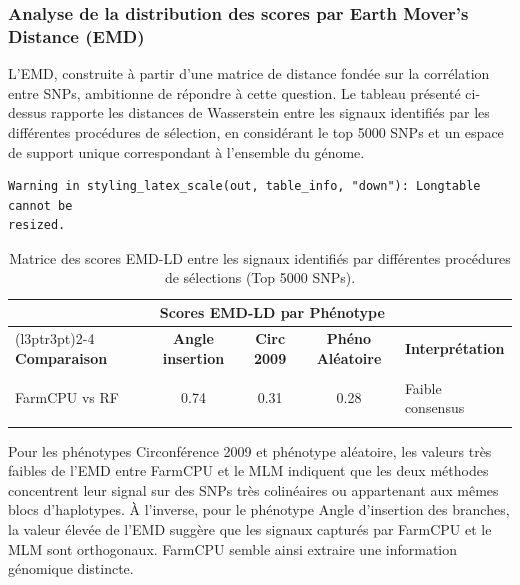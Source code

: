 \documentclass[
  11pt,
  letterpaper,
  DIV=11,
  numbers=noendperiod]{scrartcl}
\begin{document}
\hypertarget{analyse-de-la-distribution-des-scores-par-earth-movers-distance-emd}{%
\subsubsection{Analyse de la distribution des scores par Earth Mover's
Distance
(EMD)}\label{analyse-de-la-distribution-des-scores-par-earth-movers-distance-emd}}

L'EMD, construite à partir d'une matrice de distance fondée sur la
corrélation entre SNPs, ambitionne de répondre à cette question. Le
tableau présenté ci-dessus rapporte les distances de Wasserstein entre
les signaux identifiés par les différentes procédures de sélection, en
considérant le top 5000 SNPs et un espace de support unique
correspondant à l'ensemble du génome.

\begin{verbatim}
Warning in styling_latex_scale(out, table_info, "down"): Longtable cannot be
resized.
\end{verbatim}

\begin{longtable}[t]{lccc>{\raggedright\arraybackslash}p{5cm}}
\caption{Matrice des scores EMD-LD entre les signaux identifiés par différentes procédures de sélections (Top 5000 SNPs).}\\
\toprule
\multicolumn{1}{c}{ } & \multicolumn{3}{c}{Scores EMD-LD par Phénotype} & \multicolumn{1}{c}{ } \\
\cmidrule(l{3pt}r{3pt}){2-4}
\textbf{Comparaison} & \textbf{Angle insertion} & \textbf{Circ 2009} & \textbf{Phéno Aléatoire} & \textbf{Interprétation}\\
\midrule
\cellcolor{gray!10}{FarmCPU vs MLM} & \cellcolor{gray!10}{0.63} & \cellcolor{gray!10}{0.05} & \cellcolor{gray!10}{0.02} & \cellcolor{gray!10}{Divergence conditionnelle au succès FarmCPU}\\
FarmCPU vs RF & 0.74 & 0.31 & 0.28 & Faible consensus\\
\cellcolor{gray!10}{MLM vs RF} & \cellcolor{gray!10}{0.17} & \cellcolor{gray!10}{0.28} & \cellcolor{gray!10}{0.27} & \cellcolor{gray!10}{Faible consensus}\\
\bottomrule
\end{longtable}

Pour les phénotypes Circonférence 2009 et phénotype aléatoire, les
valeurs très faibles de l'EMD entre FarmCPU et le MLM indiquent que les
deux méthodes concentrent leur signal sur des SNPs très colinéaires ou
appartenant aux mêmes blocs d'haplotypes. À l'inverse, pour le phénotype
Angle d'insertion des branches, la valeur élevée de l'EMD suggère que
les signaux capturés par FarmCPU et le MLM sont orthogonaux. FarmCPU
semble ainsi extraire une information génomique distincte.
\end{document}
